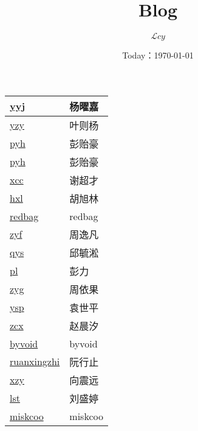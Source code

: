\documentclass[a4paper]{article}
\date{Today：\today}
\title{Blog}
\author{{$\mathcal Lcy$}}
\newcommand{\song}{\CJKfamily{song}}
\begin{document}
	
	\maketitle
	
	\song
	
	\begin{longtable}{|p{5cm}|p{5cm}|}
		
		\hline
		\href{http://blog.csdn.net/yjschaf?viewmode=contents}{yyj} & 杨曜嘉\\
		
		\hline
		\href{http://blog.csdn.net/zhayan9qvq?viewmode=contents}{yzy} & 叶则杨\\
		
		\hline
		\href{http://blog.csdn.net/xy20130630?viewmode=contents}{pyh} & 彭贻豪\\
		
		\hline
		\href{http://xy20130630.github.io/}{pyh} & 彭贻豪\\
		
		\hline
		\href{http://blog.csdn.net/cuso45h20?viewmode=contents}{xcc} & 谢超才\\
		
		\hline
		\href{http://www.cnblogs.com/Exbilar}{hxl} & 胡旭林\\
		
		\hline
		\href{http://redbag.pw/}{redbag} & redbag\\
		
		\hline
		\href{http://www.cnblogs.com/1-1-1-1}{zyf} & 周逸凡\\
		
		\hline
		\href{http://blog.csdn.net/saramanda}{qys} & 邱毓淞\\
		
		\hline
		\href{http://www.cnblogs.com/Idvzchuscvol/}{pl} & 彭力\\
		
		\hline
		\href{http://blog.csdn.net/zyg0121?viewmode=contents}{zyg} & 周依果\\
		
		\hline
		\href{http://www.cnblogs.com/Robert-Yuan/p/5724180.html}{ysp} & 袁世平\\
		
		\hline
		\href{http://blog.csdn.net/etta19}{zcx} & 赵晨汐\\
		
		\hline
		\href{https://www.byvoid.com/}{byvoid} & byvoid\\
		
		\hline
		\href{https://ruanx.pw/}{ruanxingzhi} & 阮行止\\
		
		\hline
		\href{http://k-xzy.cf/}{xzy} & 向震远\\
		
		\hline
		\href{http://www.cnblogs.com/anding-16}{lst} & 刘盛婷\\
		
		\hline
		\href{http://blog.miskcoo.com/}{miskcoo} & miskcoo\\
		
	\end{longtable}
	
\end{document}
